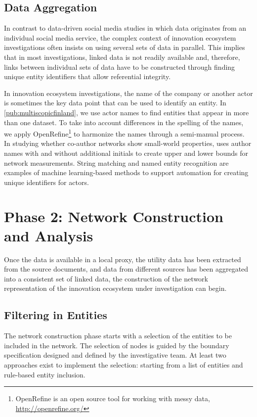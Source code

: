\subsection{Data Aggregation}

In contrast to data-driven social media studies in which data originates from an individual social media service, the complex context of innovation ecosystem investigations often insists on using several sets of data in parallel. This implies that in most investigations, linked data is not readily available and, therefore, links between individual sets of data have to be constructed through finding unique entity identifiers that allow referential integrity. 

In innovation ecosystem investigations, the name of the company or another actor is sometimes the key data point that can be used to identify an entity. In \ref{pub:multiscopicfinland}, we use actor names to find entities that appear in more than one dataset. To take into account differences in the spelling of the names, we apply OpenRefine\footnote{OpenRefine is an open source tool for working with messy data, \url{http://openrefine.org/}} to harmonize the names through a semi-manual process. In studying whether co-author networks show small-world properties, \cite{Newman2001TheNetworks} uses author names with and without additional initials to create upper and lower bounds for network measurements. String matching \citep{Navarro2001AMatching} and named entity recognition \citep{Finkel2005IncorporatingSampling} are examples of machine learning-based methods to support automation for creating unique identifiers for actors. 

\section{Phase 2: Network Construction and Analysis}
\label{subsec:modelphase2}

Once the data is available in a local proxy, the utility data has been extracted from the source documents, and data from different sources has been aggregated into a consistent set of linked data, the construction of the network representation of the innovation ecosystem under investigation can begin.

\subsection{Filtering in Entities}

The network construction phase starts with a selection of the entities to be included in the network. The selection of nodes is guided by the boundary specification designed and defined by the investigative team. At least two approaches exist to implement the selection: starting from a list of entities and rule-based entity inclusion.

